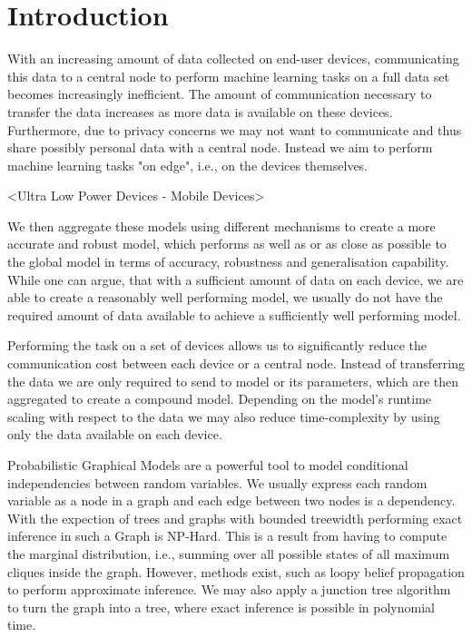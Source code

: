    
    \section{Introduction}
    With an increasing amount of data collected on end-user devices, communicating this data to a central node to perform machine learning tasks on a full data set becomes increasingly inefficient.
    The amount of communication necessary to transfer the data increases as more data is available on these devices.
    Furthermore, due to privacy concerns we may not want to communicate and thus share possibly personal data with a central node.
    Instead we aim to perform machine learning tasks "on edge", i.e., on the devices themselves.

    <Ultra Low Power Devices - Mobile Devices>

    We then aggregate these models using different mechanisms to create a more accurate and robust model, which performs as well as  or as close as possible to the global model in terms of accuracy, robustness and generalisation capability.
    While one can argue, that with a sufficient amount of data on each device, we are able to create a reasonably well performing model, we usually do not have the required amount of data available to achieve a sufficiently well performing model.
    
    Performing the task on a set of devices allows us to significantly reduce the communication cost between each device or a central node.
    Instead of transferring the data we are only required to send to model or its parameters, which are then aggregated to create a compound model.
    Depending on the model's runtime scaling with respect to the data we may also reduce time-complexity by using only the data available on each device.
    
    Probabilistic Graphical Models are a powerful tool to model conditional independencies between random variables. We usually express each random variable as a node in a graph and each edge between two nodes is a dependency. 
    With the expection of trees and graphs with bounded treewidth performing exact inference in such a Graph is NP-Hard.
    This is a result from having to compute the marginal distribution, i.e., summing over all possible states of all maximum cliques inside the graph.
    However, methods exist, such as loopy belief propagation to perform approximate inference.
    We may also apply a junction tree algorithm to turn the graph into a tree, where exact inference is possible in polynomial time.

